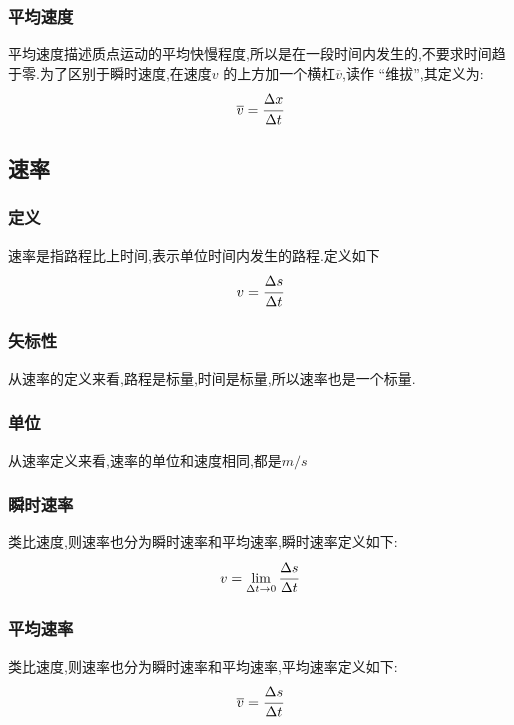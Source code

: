 \subsubsection{平均速度}
平均速度描述质点运动的平均快慢程度,所以是在一段时间内发生的,不要求时间趋于零.为了区别于瞬时速度,在速度$v$ 的上方加一个横杠$\overline{v}$,读作 ``维拔'',其定义为:
\begin{equation}
\overline{v}=\cfrac{\Delta x}{\Delta t}
  \label{eq:average velocity}
\end{equation}

\subsection{速率}
\subsubsection{定义}
速率是指路程比上时间,表示单位时间内发生的路程.定义如下
\begin{equation}
v=\cfrac{\Delta s}{\Delta t}
  \label{eq:speed}
\end{equation}

\subsubsection{矢标性}
从速率的定义来看,路程是标量,时间是标量,所以速率也是一个标量.

\subsubsection{单位}
从速率定义来看,速率的单位和速度相同,都是$m/s$



\subsubsection{瞬时速率}
类比速度,则速率也分为瞬时速率和平均速率,瞬时速率定义如下:
\begin{equation}
v=\lim_{\Delta t \to 0} \cfrac{\Delta s}{\Delta t}
  \label{eq:instantaneous speed}
\end{equation}

\subsubsection{平均速率}
类比速度,则速率也分为瞬时速率和平均速率,平均速率定义如下:
\begin{equation}
\overline{v}=\cfrac{\Delta s}{\Delta t}
  \label{eq:average speed}
\end{equation}

